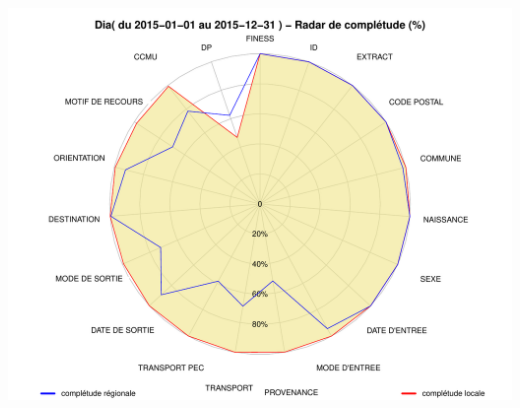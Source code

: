 \documentclass[]{article}
\begin{document}
\includegraphics{completude_files/figure-latex/finess-5.pdf}
\end{document}
